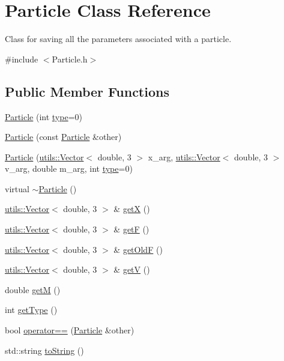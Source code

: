 \hypertarget{classParticle}{\section{Particle Class Reference}
\label{classParticle}
}


Class for saving all the parameters associated with a particle.  




{\ttfamily \#include $<$Particle.\-h$>$}

\subsection*{Public Member Functions}
\begin{DoxyCompactItemize}
\item 
\hyperlink{classParticle_a866812d3dfb9c539e5e24593e596a8c9}{Particle} (int \hyperlink{classtype}{type}=0)
\item 
\hyperlink{classParticle_a24b04cb7c6f7ea4242d25c410f44ae56}{Particle} (const \hyperlink{classParticle}{Particle} \&other)
\item 
\hyperlink{classParticle_a5a5b07aa732c302b45e90c12723f2b27}{Particle} (\hyperlink{classutils_1_1Vector}{utils\-::\-Vector}$<$ double, 3 $>$ x\-\_\-arg, \hyperlink{classutils_1_1Vector}{utils\-::\-Vector}$<$ double, 3 $>$ v\-\_\-arg, double m\-\_\-arg, int \hyperlink{classtype}{type}=0)
\item 
virtual \hyperlink{classParticle_ad030d0fe7b88cf81744b127c99244ff4}{$\sim$\-Particle} ()
\item 
\hyperlink{classutils_1_1Vector}{utils\-::\-Vector}$<$ double, 3 $>$ \& \hyperlink{classParticle_ab7ade5dc156dfa0234aa0323564e46ed}{get\-X} ()
\item 
\hyperlink{classutils_1_1Vector}{utils\-::\-Vector}$<$ double, 3 $>$ \& \hyperlink{classParticle_acd84c445e2bd5f5280a00e76cfe73fe0}{get\-F} ()
\item 
\hyperlink{classutils_1_1Vector}{utils\-::\-Vector}$<$ double, 3 $>$ \& \hyperlink{classParticle_a1204435fc08c697b0fea230616d1bbdf}{get\-Old\-F} ()
\item 
\hyperlink{classutils_1_1Vector}{utils\-::\-Vector}$<$ double, 3 $>$ \& \hyperlink{classParticle_aaf3ecbc6e1e31b259fe239461ba13dbd}{get\-V} ()
\item 
double \hyperlink{classParticle_aa1ca800f9be9dd4bd6c604f608095b24}{get\-M} ()
\item 
int \hyperlink{classParticle_a0581d7b629eb17ac5bef8e934852ca8b}{get\-Type} ()
\item 
bool \hyperlink{classParticle_a5034babb77618a56e00927d8891afabe}{operator==} (\hyperlink{classParticle}{Particle} \&other)
\item 
std\-::string \hyperlink{classParticle_a07d071a0f91f8ce7413201a6db3afe7b}{to\-String} ()
\end{DoxyCompactItemize}
